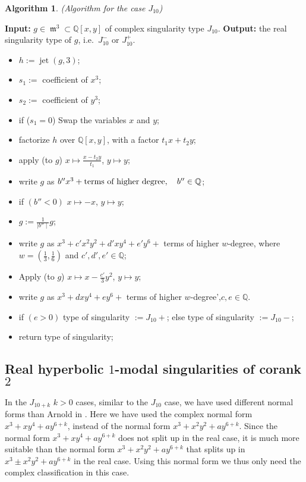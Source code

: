\documentclass{amsproc}
\DeclareMathOperator{\m}{\mathfrak{m}}
\DeclareMathOperator{\jt}{jet}
\begin{document}
\newtheorem{J[10]}[kjet]{Algorithm}
\begin{J[10]}(Algorithm for the case $J_{10}$)
\end{J[10]}
\noindent\textnormal{\bf Input:} $g\in \m^3\subset\mathbb Q[x,y]$ of complex singularity type $J_{10}$.\newline
\textnormal{\bf Output:} the real singularity type of $g$, i.e.~$J_{10}^-$ or $J_{10}^+$.
\begin{itemize}
\item $h:= \jt(g,3)$;
\item $s_1:=$ coefficient of $x^3$;
\item $s_2:=$ coefficient of $y^3$;
\item if ($s_1=0$)\newline
\phantom{}\quad\quad Swap the variables $x$ and $y$;
\item factorize $h$ over $\mathbb Q[x,y]$, with a factor $t_1x+t_2y$;
\item apply (to $g$) $x\mapsto\frac{x-t_2y}{t_1}$, $y\mapsto y$;
\item write $g$ as $b''x^3+\textnormal{terms of higher degree},\quad b''\in\mathbb Q$;
\item if $(b'' <0)$\newline
\phantom{}\quad $x\mapsto -x$, $y\mapsto y$;
\item $g:= \frac{1}{\mid b''\mid} g$;
\item write $g$ as $x^3+c'x^2y^2+d'xy^4+e'y^6+$ terms of higher $w$-degree, where $w=(\frac{1}{3},\frac{1}{6})$ and $c',d',e'\in\mathbb Q$;
\item Apply (to $g$) $x\mapsto x-\frac{c'}{3}y^2$, $y\mapsto y$;
\item write $g$ as $x^3+dxy^4+ey^6+$ terms of higher $w$-degree',\quad $c,e\in\mathbb Q$.
\item if $(e>0)$\newline
\phantom{}\quad  type of singularity $:=J_{10}+$;\newline
\phantom{}else\newline
\phantom{}\quad type of singularity $:=J_{10}-$;
\item return type of singularity;
\end{itemize}

\subsection{Real hyperbolic $1$-modal singularities of corank $2$}
In the $J_{10+k}$ $k>0$ cases, similar to the $J_{10}$ case, we have used different normal forms than Arnold in \cite{AVG1985}.
Here we have used the complex normal form $x^3+xy^4+a y^{6+k}$, instead of the normal form $x^3+x^2y^2+ay^{6+k}$. Since the normal form $x^3+xy^4+a y^{6+k}$ does not split up in the real case, it is much more suitable than the normal form $x^3+x^2y^2+ay^{6+k}$ that splits up in $x^3\pm x^2y^2+ay^{6+k}$ in the real case. Using this normal form we thus only need the complex classification in this case.
\end{document}

